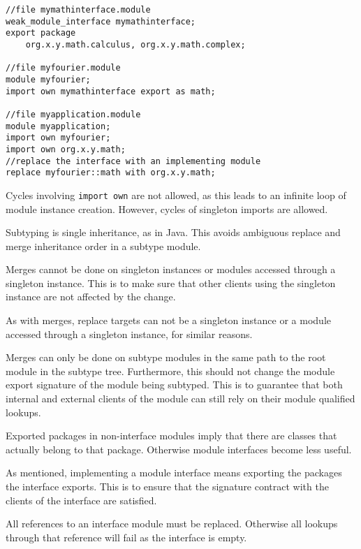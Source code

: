 \begin{lstlisting}[caption=Weak Interfaces]
//file mymathinterface.module
weak_module_interface mymathinterface;
export package 
	org.x.y.math.calculus, org.x.y.math.complex;

//file myfourier.module
module myfourier;
import own mymathinterface export as math;

//file myapplication.module
module myapplication;
import own myfourier;
import own org.x.y.math;
//replace the interface with an implementing module
replace myfourier::math with org.x.y.math;
\end{lstlisting}

%


Cycles involving \texttt{import own} are not allowed, as this leads to an infinite loop of
module instance creation. However, cycles of singleton imports are allowed.

Subtyping is single inheritance, as in Java. This avoids ambiguous replace and
merge inheritance order in a subtype module.

Merges cannot be done on singleton instances or modules accessed through a
singleton instance. This is to make sure that other clients using the singleton
instance are not affected by the change.

As with merges, replace targets can not be a singleton instance or a module
accessed through a singleton instance, for similar reasons. 

Merges can only be done on subtype modules in the same path to the root module in
the subtype tree. Furthermore, this should not change the module export signature
of the module being subtyped. This is to guarantee that both internal and external
clients of the module can still rely on their module qualified lookups.

Exported packages in non-interface modules imply that there are classes that actually 
belong to that package. Otherwise module interfaces become less useful.

As mentioned, implementing a module interface means exporting the packages the interface
exports. This is to ensure that the signature contract with the clients of
the interface are satisfied.

All references to an interface module must be replaced. Otherwise all lookups through 
that reference will fail as the interface is empty. 